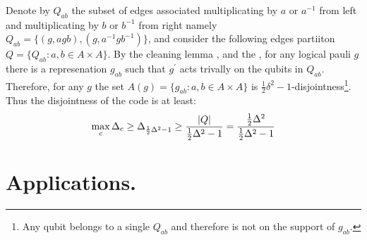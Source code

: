 \documentclass[manuscript,screen,review]{acmart}
\begin{document}
{\begin{enumerate}
  Denote by $Q_{ab}$ the subset of edges associated multiplicating by $a$ or $a^{-1}$ from left and multiplicating by $b$ or $b^{-1}$ from right namely $ Q_{ab} =  \{ (g, agb), (g, a^{-1}gb^{-1}) \} $, and consider the following edges partiiton $Q = \{ Q_{ab} : a,b \in A\times A \}$. By the cleaning lemma \cite{Bravyi_2009}\cite{cleaning_lemm_2}, and the , for any logical pauli $g$ there is a represenation $g_{ab}$ such that $g^{\prime}$ acts trivally on the qubits in $Q_{ab}$. Therefore, for any $g$ the set $ A(g) = \{ g_{ab} : a,b \in A \times A \}$  is $ \frac{1}{2}\delta^{2}-1$-disjointness\footnote{Any qubit belongs to a single $Q_{ab}$ and therefore is not on the support of $g_{ab}$.}. Thus the disjointness of the code is at least: 
  \begin{equation*}
    \begin{split}
      \max_{c} \Delta_{c} \ge \Delta_{\frac{1}{2} \Delta^{2} - 1 } \ge \frac{  |Q|   }{\frac{1}{2} \Delta^{2} - 1  } = \frac{ \frac{1}{2} \Delta^{2} }{\frac{1}{2} \Delta^{2} - 1 }
    \end{split}
  \end{equation*} 

\end{enumerate}




  \section {Applications.} \label{sec:app}

}
\end{document}
